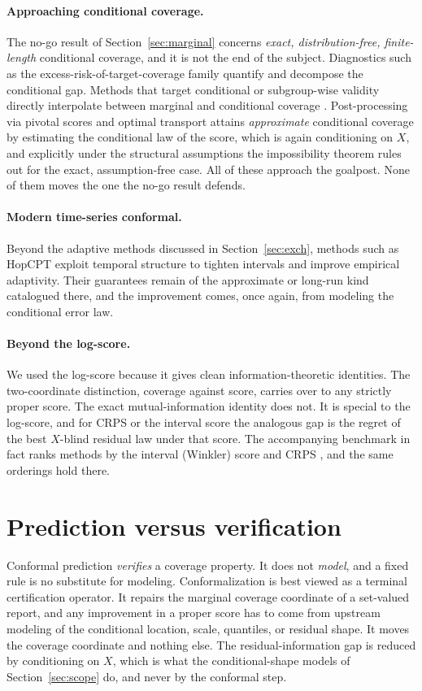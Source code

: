 \documentclass[11pt]{article}
\theoremstyle{definition}
\begin{document}
\paragraph{Approaching conditional coverage.}
The no-go result of Section~\ref{sec:marginal} concerns \emph{exact, distribution-free,
finite-length} conditional coverage, and it is not the end of the subject. Diagnostics such
as the excess-risk-of-target-coverage family \citep{braun2025conditional} quantify and
decompose the conditional gap. Methods that target conditional or subgroup-wise validity
directly interpolate between marginal and conditional coverage \citep{gibbs2025conditional}.
Post-processing via pivotal scores and optimal transport \citep{laplante2026pivotal} attains
\emph{approximate} conditional coverage by estimating the conditional law of the score,
which is again conditioning on $X$, and explicitly under the structural assumptions the
impossibility theorem rules out for the exact, assumption-free case. All of these approach
the goalpost. None of them moves the one the no-go result defends.

\paragraph{Modern time-series conformal.}
Beyond the adaptive methods discussed in Section~\ref{sec:exch}, methods such as HopCPT
\citep{auer2023hopcpt} exploit temporal structure to tighten intervals and improve empirical
adaptivity. Their guarantees remain of the approximate or long-run kind catalogued there,
and the improvement comes, once again, from modeling the conditional error law.

\paragraph{Beyond the log-score.}
We used the log-score because it gives clean information-theoretic identities. The
two-coordinate distinction, coverage against score, carries over to any strictly proper
score. The exact mutual-information identity does not. It is special to the log-score, and
for CRPS or the interval score the analogous gap is the regret of the best $X$-blind
residual law under that score. The accompanying benchmark in fact ranks methods by the
interval (Winkler) score and CRPS \citep{gneiting2007strictly}, and the same orderings hold
there.

\section{Prediction versus verification}\label{sec:verification}
Conformal prediction \emph{verifies} a coverage property. It does not \emph{model}, and a
fixed rule is no substitute for modeling. Conformalization is best viewed as a terminal
certification operator. It repairs the marginal coverage coordinate of a set-valued report,
and any improvement in a proper score has to come from upstream modeling of the conditional
location, scale, quantiles, or residual shape. It moves the coverage coordinate and nothing
else. The residual-information gap is reduced by conditioning on $X$, which is what the
conditional-shape models of Section~\ref{sec:scope} do, and never by the conformal step.
\end{document}
